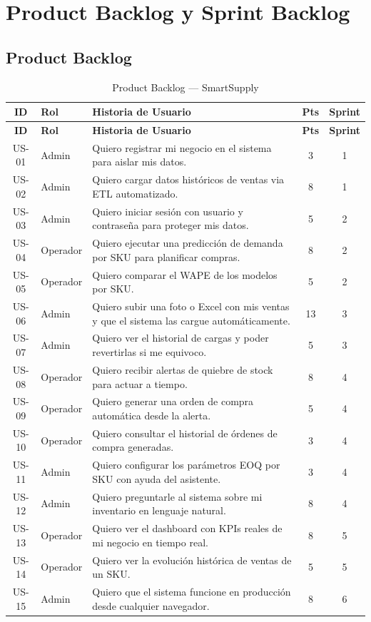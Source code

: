 \documentclass[12pt, a4paper]{report}
\begin{document}
\chapter{Product Backlog y Sprint Backlog}

\section{Product Backlog}

\begin{longtable}{clp{5.5cm}cc}
  \caption{Product Backlog — SmartSupply} \label{tab:backlog} \\
  \toprule
  \textbf{ID} & \textbf{Rol} & \textbf{Historia de Usuario} & \textbf{Pts} & \textbf{Sprint} \\
  \midrule
  \endfirsthead
  \toprule
  \textbf{ID} & \textbf{Rol} & \textbf{Historia de Usuario} & \textbf{Pts} & \textbf{Sprint} \\
  \midrule
  \endhead
  \bottomrule
  \endfoot
  US-01 & Admin    & Quiero registrar mi negocio en el sistema para aislar mis datos. & 3 & 1 \\
  US-02 & Admin    & Quiero cargar datos históricos de ventas via ETL automatizado.    & 8 & 1 \\
  US-03 & Admin    & Quiero iniciar sesión con usuario y contraseña para proteger mis datos. & 5 & 2 \\
  US-04 & Operador & Quiero ejecutar una predicción de demanda por SKU para planificar compras. & 8 & 2 \\
  US-05 & Operador & Quiero comparar el WAPE de los modelos por SKU. & 5 & 2 \\
  US-06 & Admin    & Quiero subir una foto o Excel con mis ventas y que el sistema las cargue automáticamente. & 13 & 3 \\
  US-07 & Admin    & Quiero ver el historial de cargas y poder revertirlas si me equivoco. & 5 & 3 \\
  US-08 & Operador & Quiero recibir alertas de quiebre de stock para actuar a tiempo. & 8 & 4 \\
  US-09 & Operador & Quiero generar una orden de compra automática desde la alerta.   & 5 & 4 \\
  US-10 & Operador & Quiero consultar el historial de órdenes de compra generadas.    & 3 & 4 \\
  US-11 & Admin    & Quiero configurar los parámetros EOQ por SKU con ayuda del asistente. & 3 & 4 \\
  US-12 & Admin    & Quiero preguntarle al sistema sobre mi inventario en lenguaje natural. & 8 & 4 \\
  US-13 & Operador & Quiero ver el dashboard con KPIs reales de mi negocio en tiempo real. & 8 & 5 \\
  US-14 & Operador & Quiero ver la evolución histórica de ventas de un SKU.           & 5 & 5 \\
  US-15 & Admin    & Quiero que el sistema funcione en producción desde cualquier navegador. & 8 & 6 \\
\end{longtable}
\end{document}
